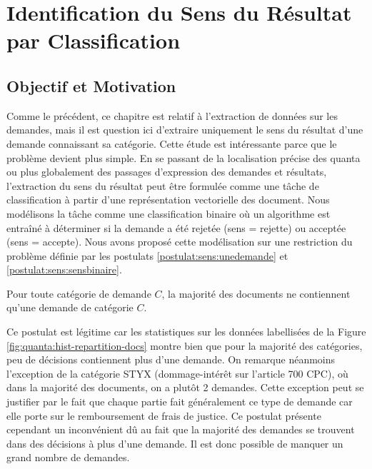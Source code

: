 \chapter{Identification du Sens du Résultat par Classification}
\label{sec:sensresultat}

\section{Objectif et Motivation}
\label{sec:sensresultat:motivation}
Comme le précédent, ce chapitre est relatif à l'extraction de données sur les demandes, mais  il est question ici d'extraire uniquement le sens du résultat d'une demande connaissant sa catégorie. Cette étude est intéressante parce que le problème devient plus simple. En se passant de la localisation précise des quanta ou plus globalement des passages d'expression des demandes et résultats, l'extraction du sens du résultat peut être formulée comme une tâche de classification à partir d'une représentation vectorielle des document. Nous modélisons la tâche comme une classification binaire où un algorithme est entraîné à déterminer si la demande a été rejetée (sens = rejette) ou acceptée (sens = accepte). Nous avons proposé cette modélisation sur une restriction du problème définie par les postulats \ref{postulat:sens:unedemande} et \ref{postulat:sens:sensbinaire}.

\begin{postulat}\label{postulat:sens:unedemande}
Pour toute catégorie de demande $C$, la majorité des documents ne contiennent qu'une demande de catégorie $C$.
\end{postulat} 
Ce postulat est légitime car les statistiques sur les données labellisées de la Figure \ref{fig:quanta:hist-repartition-docs} montre bien que pour la majorité des catégories, peu de décisions contiennent plus d'une demande. On remarque néanmoins l'exception de la catégorie STYX (dommage-intérêt sur l'article 700 CPC), où dans la majorité des documents, on a plutôt 2 demandes. Cette exception peut se justifier par le fait que chaque partie fait généralement ce type de demande car elle porte sur le remboursement de frais de justice. Ce postulat présente cependant un inconvénient dû au fait que la majorité des demandes se trouvent dans des décisions à plus d'une demande. Il est donc possible de manquer un grand nombre de demandes. %

